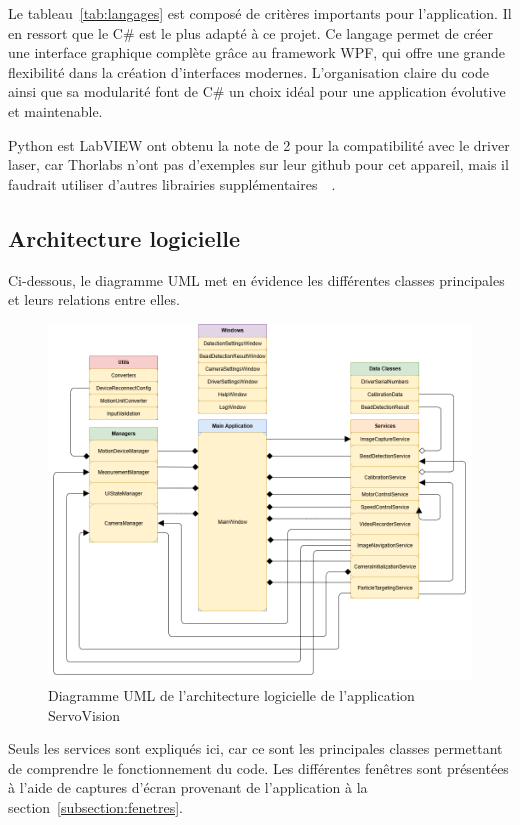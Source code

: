 Le tableau~\ref{tab:langages} est composé de critères importants pour l'application. Il en ressort que le C\# est le plus adapté à ce projet. Ce langage permet de créer une interface graphique complète grâce au framework WPF, qui offre une grande flexibilité dans la création d'interfaces modernes. L'organisation claire du code ainsi que sa modularité font de C\# un choix idéal pour une application évolutive et maintenable.

Python est LabVIEW ont obtenu la note de 2 pour la compatibilité avec le driver laser, car Thorlabs n'ont pas d'exemples sur leur github pour cet appareil, mais il faudrait utiliser d'autres librairies supplémentaires~\cite{controlLaserDriverPython}~\cite{controlLaserDriverLabVIEW}.

\newpage
\subsection{Architecture logicielle}
Ci-dessous, le diagramme UML met en évidence les différentes classes principales et leurs relations entre elles.
\begin{figure}[H]
    \centering
    \includegraphics[width=\textwidth]{assets/figures/Application_ServoVision/ServoVision_UML_Diagram.drawio.png}
    \caption{Diagramme UML de l'architecture logicielle de l'application ServoVision}
    \label{uml_servovision}
\end{figure}

Seuls les services sont expliqués ici, car ce sont les principales classes permettant de comprendre le fonctionnement du code. Les différentes fenêtres sont présentées à l'aide de captures d'écran provenant de l'application à la section~\ref{subsection:fenetres}.

